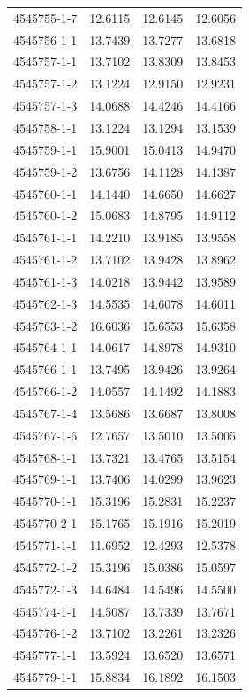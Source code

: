 \begin{longtable}{lrrr}
4545755-1-7 & 12.6115 & 12.6145 & 12.6056 \\
4545756-1-1 & 13.7439 & 13.7277 & 13.6818 \\
4545757-1-1 & 13.7102 & 13.8309 & 13.8453 \\
4545757-1-2 & 13.1224 & 12.9150 & 12.9231 \\
4545757-1-3 & 14.0688 & 14.4246 & 14.4166 \\
4545758-1-1 & 13.1224 & 13.1294 & 13.1539 \\
4545759-1-1 & 15.9001 & 15.0413 & 14.9470 \\
4545759-1-2 & 13.6756 & 14.1128 & 14.1387 \\
4545760-1-1 & 14.1440 & 14.6650 & 14.6627 \\
4545760-1-2 & 15.0683 & 14.8795 & 14.9112 \\
4545761-1-1 & 14.2210 & 13.9185 & 13.9558 \\
4545761-1-2 & 13.7102 & 13.9428 & 13.8962 \\
4545761-1-3 & 14.0218 & 13.9442 & 13.9589 \\
4545762-1-3 & 14.5535 & 14.6078 & 14.6011 \\
4545763-1-2 & 16.6036 & 15.6553 & 15.6358 \\
4545764-1-1 & 14.0617 & 14.8978 & 14.9310 \\
4545766-1-1 & 13.7495 & 13.9426 & 13.9264 \\
4545766-1-2 & 14.0557 & 14.1492 & 14.1883 \\
4545767-1-4 & 13.5686 & 13.6687 & 13.8008 \\
4545767-1-6 & 12.7657 & 13.5010 & 13.5005 \\
4545768-1-1 & 13.7321 & 13.4765 & 13.5154 \\
4545769-1-1 & 13.7406 & 14.0299 & 13.9623 \\
4545770-1-1 & 15.3196 & 15.2831 & 15.2237 \\
4545770-2-1 & 15.1765 & 15.1916 & 15.2019 \\
4545771-1-1 & 11.6952 & 12.4293 & 12.5378 \\
4545772-1-2 & 15.3196 & 15.0386 & 15.0597 \\
4545772-1-3 & 14.6484 & 14.5496 & 14.5500 \\
4545774-1-1 & 14.5087 & 13.7339 & 13.7671 \\
4545776-1-2 & 13.7102 & 13.2261 & 13.2326 \\
4545777-1-1 & 13.5924 & 13.6520 & 13.6571 \\
4545779-1-1 & 15.8834 & 16.1892 & 16.1503 \\

\end{longtable}
